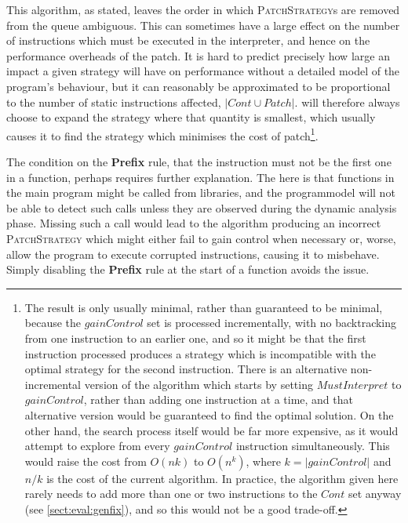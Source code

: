 This algorithm, as stated, leaves the order in which
\textsc{PatchStrategy}s are removed from the queue ambiguous.  This
can sometimes have a large effect on the number of instructions which
must be executed in the interpreter, and hence on the performance
overheads of the patch.  It is hard to predict precisely how large an
impact a given strategy will have on performance without a detailed
model of the program's behaviour, but it can reasonably be
approximated to be proportional to the number of static instructions
affected, $|\mathit{Cont} \cup \mathit{Patch}|$.  {\Implementation}
will therefore always choose to expand the strategy where that
quantity is smallest, which usually causes it to find the strategy
which minimises the cost of patch\footnote{The result is only usually
  minimal, rather than guaranteed to be minimal, because the
  $\mathit{gainControl}$ set is processed incrementally, with no
  backtracking from one instruction to an earlier one, and so it might
  be that the first instruction processed produces a strategy which is
  incompatible with the optimal strategy for the second instruction.
  There is an alternative non-incremental version of the algorithm
  which starts by setting $\mathit{MustInterpret}$ to
  $\mathit{gainControl}$, rather than adding one instruction at a
  time, and that alternative version would be guaranteed to find the
  optimal solution.  On the other hand, the search process itself
  would be far more expensive, as it would attempt to explore from
  every $\mathit{gainControl}$ instruction simultaneously.  This would
  raise the cost from $O(nk)$ to $O(n^k)$, where $k =
  |\mathit{gainControl}|$ and $n/k$ is the cost of the current
  algorithm.  In practice, the algorithm given here rarely needs to
  add more than one or two instructions to the $\mathit{Cont}$ set
  anyway (see \autoref{sect:eval:genfix}), and so this would not be a
  good trade-off.}.

The condition on the \textbf{Prefix} rule, that the instruction must
not be the first one in a function, perhaps requires further
explanation.  The here is that functions in the main program might be
called from libraries, and the \gls{programmodel} will
not be able to detect such calls unless they are observed during the
dynamic analysis phase.  Missing such a call would lead to the
algorithm producing an incorrect \textsc{PatchStrategy} which might
either fail to gain control when necessary or, worse, allow the
program to execute corrupted instructions, causing it to misbehave.
Simply disabling the \textbf{Prefix} rule at the start of a function
avoids the issue.

